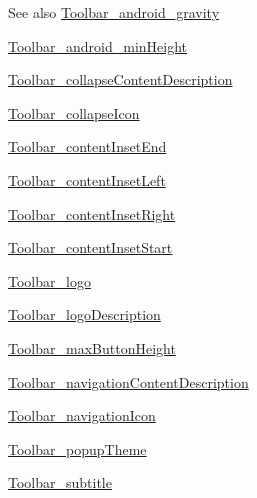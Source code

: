 \begin{DoxySeeAlso}{See also}
\hyperlink{classandroid_1_1support_1_1design_1_1R_1_1styleable_a284a71ada839c36b151c703e6669cb1f}{Toolbar\+\_\+android\+\_\+gravity} 

\hyperlink{classandroid_1_1support_1_1design_1_1R_1_1styleable_a896491cbc15c41005ac0372a7652eb54}{Toolbar\+\_\+android\+\_\+min\+Height} 

\hyperlink{classandroid_1_1support_1_1design_1_1R_1_1styleable_a89d74d3552a12cf237615786e552301a}{Toolbar\+\_\+collapse\+Content\+Description} 

\hyperlink{classandroid_1_1support_1_1design_1_1R_1_1styleable_ab8736925c114eaeba368273e6f851ae8}{Toolbar\+\_\+collapse\+Icon} 

\hyperlink{classandroid_1_1support_1_1design_1_1R_1_1styleable_a0ed60bf0f8960c63916d30821f0bca48}{Toolbar\+\_\+content\+Inset\+End} 

\hyperlink{classandroid_1_1support_1_1design_1_1R_1_1styleable_a16a950fb278dbd84e59f4e5475d33578}{Toolbar\+\_\+content\+Inset\+Left} 

\hyperlink{classandroid_1_1support_1_1design_1_1R_1_1styleable_afa26b6ecdf630ac0c5f79af2ca0a1f2a}{Toolbar\+\_\+content\+Inset\+Right} 

\hyperlink{classandroid_1_1support_1_1design_1_1R_1_1styleable_a6205b5236737b47332a0c7ab6459eb3d}{Toolbar\+\_\+content\+Inset\+Start} 

\hyperlink{classandroid_1_1support_1_1design_1_1R_1_1styleable_ad96363fdb81c5fc57ecb7ca211213675}{Toolbar\+\_\+logo} 

\hyperlink{classandroid_1_1support_1_1design_1_1R_1_1styleable_adad105d3b3d5e31681bf954d0a474308}{Toolbar\+\_\+logo\+Description} 

\hyperlink{classandroid_1_1support_1_1design_1_1R_1_1styleable_a23d4ceb83bb1200d96e248f73e941f3e}{Toolbar\+\_\+max\+Button\+Height} 

\hyperlink{classandroid_1_1support_1_1design_1_1R_1_1styleable_af072d08cd3f8b67300f7852fec72150c}{Toolbar\+\_\+navigation\+Content\+Description} 

\hyperlink{classandroid_1_1support_1_1design_1_1R_1_1styleable_afd9054878cb1ec4c07888ebaf463242c}{Toolbar\+\_\+navigation\+Icon} 

\hyperlink{classandroid_1_1support_1_1design_1_1R_1_1styleable_aa248f853ab7158fb2c598abe10eab5c8}{Toolbar\+\_\+popup\+Theme} 

\hyperlink{classandroid_1_1support_1_1design_1_1R_1_1styleable_a976eebe1f58a714dc8273f897a889fcc}{Toolbar\+\_\+subtitle} 


\end{DoxySeeAlso}
